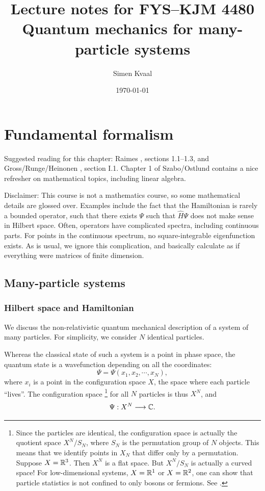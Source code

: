 \documentclass{report}
\title{Lecture notes for FYS--KJM 4480\\\large Quantum mechanics for many-particle systems}
\author{Simen Kvaal}
\date{\today}
\theoremstyle{plain}
\theoremstyle{definition}
\begin{document}
\maketitle

\tableofcontents

\chapter{Fundamental formalism}

Suggested reading for this chapter: Raimes \cite{Raimes}, sections
1.1--1.3, and Gross/Runge/Heinonen \cite{GRH}, section I.1.  Chapter 1
of Szabo/Ostlund \cite{SzaboOstlund} contains a nice refresher on
mathematical topics, including linear algebra.


Disclaimer: This course is not a mathematics course, so some
mathematical details are glossed over. Examples include the fact that
the Hamiltonian is rarely a bounded operator, such that there exists
$\Psi$ such that $\hat{H}\Psi$ does not make sense in Hilbert
space. Often, operators have complicated spectra, including continuous
parts. For points in the continuous spectrum, no square-integrable
eigenfunction exists. As is usual, we ignore this complication, and
basically calculate as if everything were matrices of finite
dimension.




\section{Many-particle systems}

\subsection{Hilbert space and Hamiltonian}

We discuss the non-relativistic quantum mechanical description of a
system of many particles. For simplicity, we consider $N$ identical
particles.

Whereas the classical state of such a system is a point in phase
space, the quantum state is a wavefunction depending on all the
coordinates:
\begin{equation}
  \Psi = \Psi(x_1,x_2,\cdots,x_N),
\end{equation}
where $x_i$ is a point in the configuration space $X$, the space where
each particle ``lives''. The
configuration space%
\footnote{Since the particles are identical, the configuration space is
actually the quotient space $X^N/S_N$, where $S_N$ is the permutation
group of $N$ objects. This means that we identify points in $X_N$ that
differ only by a permutation. Suppose $X=\mathbb{R}^3$. Then $X^N$ is a flat
space. But $X^N/S_N$ is actually a curved space! For low-dimensional
systems, $X = \mathbb{R}^1$ or $X = \mathbb{R}^2$, one can show that particle
statistics is not confined to only bosons or fermions. See \cite{Leinaas1977}.}
 for all $N$ particles is thus $X^N$, and
\begin{equation}
  \Psi : X^N \longrightarrow \mathbb{C}.
\end{equation}
\end{document}
